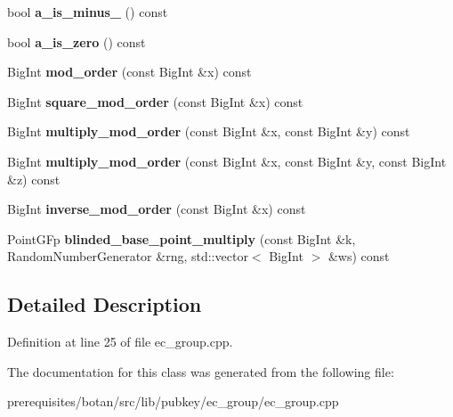 \begin{DoxyCompactItemize}
bool {\bfseries a\+\_\+is\+\_\+minus\+\_} () const
\item 
\mbox{\label{class_botan_1_1_e_c___group___data_a6d867622745168c10c1c32e0a733abd9}} 
bool {\bfseries a\+\_\+is\+\_\+zero} () const
\item 
\mbox{\label{class_botan_1_1_e_c___group___data_af8bfb310dc40407121674e9ae92c9680}} 
Big\+Int {\bfseries mod\+\_\+order} (const Big\+Int \&x) const
\item 
\mbox{\label{class_botan_1_1_e_c___group___data_ad0022b427fddb14cd684cbdb956d18ca}} 
Big\+Int {\bfseries square\+\_\+mod\+\_\+order} (const Big\+Int \&x) const
\item 
\mbox{\label{class_botan_1_1_e_c___group___data_a8ce6dd1b42fb11fc139dbf415cedab1f}} 
Big\+Int {\bfseries multiply\+\_\+mod\+\_\+order} (const Big\+Int \&x, const Big\+Int \&y) const
\item 
\mbox{\label{class_botan_1_1_e_c___group___data_a906f6a1cb8fe1edadfa9e0b3bc9c7cd8}} 
Big\+Int {\bfseries multiply\+\_\+mod\+\_\+order} (const Big\+Int \&x, const Big\+Int \&y, const Big\+Int \&z) const
\item 
\mbox{\label{class_botan_1_1_e_c___group___data_a79ba632b3bf10e07bab7f556dfe01bb0}} 
Big\+Int {\bfseries inverse\+\_\+mod\+\_\+order} (const Big\+Int \&x) const
\item 
\mbox{\label{class_botan_1_1_e_c___group___data_a2704d6ecf065e79b89fb15de28cd4b30}} 
Point\+G\+Fp {\bfseries blinded\+\_\+base\+\_\+point\+\_\+multiply} (const Big\+Int \&k, Random\+Number\+Generator \&rng, std\+::vector$<$ Big\+Int $>$ \&ws) const
\end{DoxyCompactItemize}


\subsection{Detailed Description}


Definition at line 25 of file ec\+\_\+group.\+cpp.



The documentation for this class was generated from the following file\+:\begin{DoxyCompactItemize}
\item 
prerequisites/botan/src/lib/pubkey/ec\+\_\+group/ec\+\_\+group.\+cpp\end{DoxyCompactItemize}
